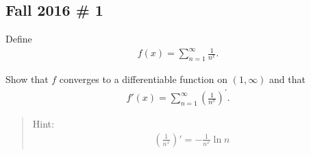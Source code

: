 \hypertarget{fall-2016-1}{%
\subsection{Fall 2016 \# 1}\label{fall-2016-1}}

Define
\begin{align*}
f(x) = \sum_{n=1}^{\infty} \frac{1}{n^{x}}.
\end{align*}

Show that \(f\) converges to a differentiable function on
\((1, \infty)\) and that
\begin{align*}
f'(x)  =\sum_{n=1}^{\infty}\left(\frac{1}{n^{x}}\right)^{\prime}.
\end{align*}

\begin{quote}
Hint:
\begin{align*}
\left(\frac{1}{n^{x}}\right)' = -\frac{1}{n^{x}} \ln n
\end{align*}
\end{quote}

